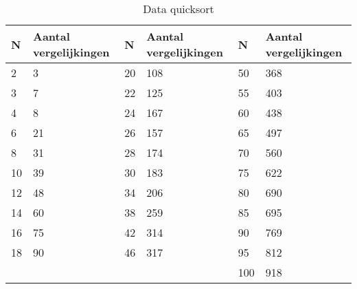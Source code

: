 \documentclass[11pt, a4paper]{article}
\begin{document}
\begin{table}[H]
\centering
\begin{tabular}{|ll|ll|ll|}
\hline
\multicolumn{1}{|l|}{\textbf{N}} & \textbf{Aantal vergelijkingen} & \multicolumn{1}{l|}{\textbf{N}} & \textbf{Aantal vergelijkingen} & \multicolumn{1}{l|}{\textbf{N}} & \textbf{Aantal vergelijkingen} \\ \hline
2                                & 3                              & 20                              & 108                            & 50                              & 368                            \\
3                                & 7                              & 22                              & 125                            & 55                              & 403                            \\
4                                & 8                              & 24                              & 167                            & 60                              & 438                            \\
6                                & 21                             & 26                              & 157                            & 65                              & 497                            \\
8                                & 31                             & 28                              & 174                            & 70                              & 560                            \\
10                               & 39                             & 30                              & 183                            & 75                              & 622                            \\
12                               & 48                             & 34                              & 206                            & 80                              & 690                            \\
14                               & 60                             & 38                              & 259                            & 85                              & 695                            \\
16                               & 75                             & 42                              & 314                            & 90                              & 769                            \\
18                               & 90                             & 46                              & 317                            & 95                              & 812                            \\
                                 &                                &                                 &                                & 100                             & 918                            \\ \hline
\end{tabular}
\caption{Data quicksort}
\label{quick}
\end{table}
\end{document}
